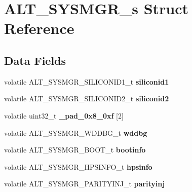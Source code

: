 \hypertarget{structALT__SYSMGR__s}{}\section{A\+L\+T\+\_\+\+S\+Y\+S\+M\+G\+R\+\_\+s Struct Reference}
\label{structALT__SYSMGR__s}
\subsection*{Data Fields}
\begin{DoxyCompactItemize}
\item 
\mbox{\label{structALT__SYSMGR__s_a2a10703cbe113a1c89868bab0fdd32e7}} 
volatile A\+L\+T\+\_\+\+S\+Y\+S\+M\+G\+R\+\_\+\+S\+I\+L\+I\+C\+O\+N\+I\+D1\+\_\+t {\bfseries siliconid1}
\item 
\mbox{\label{structALT__SYSMGR__s_a6dfde5f3229ac74a3721cf209417ad76}} 
volatile A\+L\+T\+\_\+\+S\+Y\+S\+M\+G\+R\+\_\+\+S\+I\+L\+I\+C\+O\+N\+I\+D2\+\_\+t {\bfseries siliconid2}
\item 
\mbox{\label{structALT__SYSMGR__s_a8aec50dfeddbc3819ccb978aa11206b1}} 
volatile uint32\+\_\+t {\bfseries \+\_\+pad\+\_\+0x8\+\_\+0xf} \mbox{[}2\mbox{]}
\item 
\mbox{\label{structALT__SYSMGR__s_ab515b28bbf30af9ca2a23bd3ffbe133b}} 
volatile A\+L\+T\+\_\+\+S\+Y\+S\+M\+G\+R\+\_\+\+W\+D\+D\+B\+G\+\_\+t {\bfseries wddbg}
\item 
\mbox{\label{structALT__SYSMGR__s_a21e24ae77ace1724efcbbaf943bb04e2}} 
volatile A\+L\+T\+\_\+\+S\+Y\+S\+M\+G\+R\+\_\+\+B\+O\+O\+T\+\_\+t {\bfseries bootinfo}
\item 
\mbox{\label{structALT__SYSMGR__s_a0c305737baee1759bab8c6f52752f0d8}} 
volatile A\+L\+T\+\_\+\+S\+Y\+S\+M\+G\+R\+\_\+\+H\+P\+S\+I\+N\+F\+O\+\_\+t {\bfseries hpsinfo}
\item 
\mbox{\label{structALT__SYSMGR__s_a91d94e34b94d1080ebbbb25bddcfeb8d}} 
volatile A\+L\+T\+\_\+\+S\+Y\+S\+M\+G\+R\+\_\+\+P\+A\+R\+I\+T\+Y\+I\+N\+J\+\_\+t {\bfseries parityinj}
\item 
\mbox{\label{structALT__SYSMGR__s_a2aed412b5285568ad65379cc5d9bde87}} 

\end{DoxyCompactItemize}

